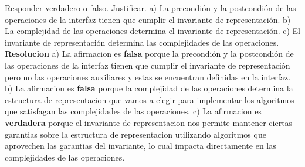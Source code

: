 \documentclass[10pt,a4paper]{article}
\begin{document}
Responder verdadero o falso. Justificar.
\newline
\newline
a) La precondión y la postcondión de las operaciones de la interfaz tienen que cumplir el invariante de representación.
\newline
\newline
b) La complejidad de las operaciones determina el invariante de representación.
\newline
\newline
c) El invariante de representación determina las complejidades de las operaciones.
\newline
\newline
\textbf{Resolucion}
\newline
\newline
a) La afirmacion es \textbf{falsa} porque la precondión y la postcondión de las operaciones de la interfaz tienen que cumplir el invariante de representación pero no las operaciones auxiliares y estas se encuentran definidas en la interfaz. 
\newline
\newline
b) La afirmacion es \textbf{falsa} porque la complejidad de las operaciones determina la estructura de representacion que vamos a elegir para implementar los algoritmos que satisfagan las complejidades de las operaciones.
\newline
\newline
c) La afirmacion es \textbf{verdadera} porque el invariante de representacion nos permite mantener ciertas garantias sobre la estructura de representacion utilizando algoritmos que aprovechen las garantias del invariante, lo cual impacta directamente en las complejidades de las operaciones.
\end{document}
